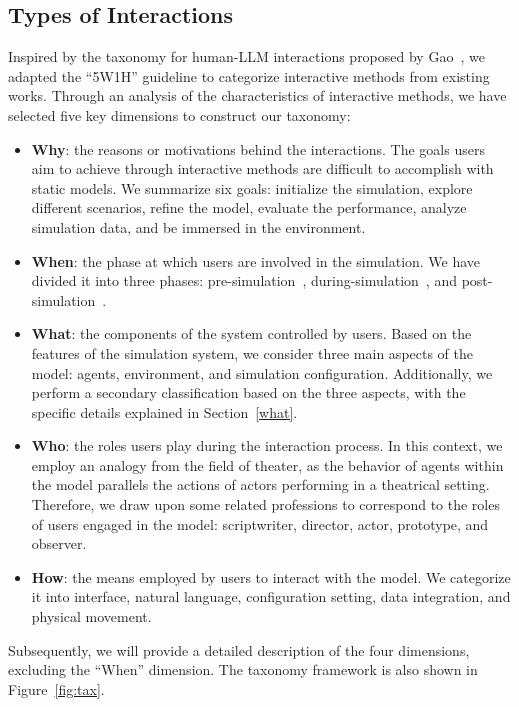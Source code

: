 \subsection{Types of Interactions}
Inspired by the taxonomy for human-LLM interactions proposed by Gao\etal~\cite{10.1145/3613905.3650786}, we adapted the ``5W1H'' guideline to categorize interactive methods from existing works.
Through an analysis of the characteristics of interactive methods, we have selected five key dimensions to construct our taxonomy:
\begin{itemize}
\item {\textbf{Why}}: the reasons or motivations behind the interactions. The goals users aim to achieve through interactive methods are difficult to accomplish with static models.
We summarize six goals: initialize the simulation, explore different scenarios, refine the model, evaluate the performance, analyze simulation data, and be immersed in the environment.
\item {\textbf{When}}: the phase at which users are involved in the simulation. 
We have divided it into three phases: pre-simulation~\cite{gao2023s3socialnetworksimulationlarge}, during-simulation~\cite{chen2023agentversefacilitatingmultiagentcollaboration,Padmakumar_Thomason_Shrivastava_Lange_Narayan-Chen_Gella_Piramuthu_Tur_Hakkani-Tur_2022}, and post-simulation~\cite{10520238}.
\item {\textbf{What}}: the components of the system controlled by users. 
Based on the features of the simulation system, we consider three main aspects of the model: agents, environment, and simulation configuration.
Additionally, we perform a secondary classification based on the three aspects, with the specific details explained in Section~\ref {what}.
\item {\textbf{Who}}: the roles users play during the interaction process. 
In this context, we employ an analogy from the field of theater, as the behavior of agents within the model parallels the actions of actors performing in a theatrical setting.
Therefore, we draw upon some related professions to correspond to the roles of users engaged in the model: scriptwriter, director, actor, prototype, and observer.
\item {\textbf{How}}: the means employed by users to interact with the model. 
We categorize it into interface, natural language, configuration setting, data integration, and physical movement.
\end{itemize}

Subsequently, we will provide a detailed description of the four dimensions, excluding the ``When'' dimension. The taxonomy framework is also shown in Figure~\ref{fig:tax}.

